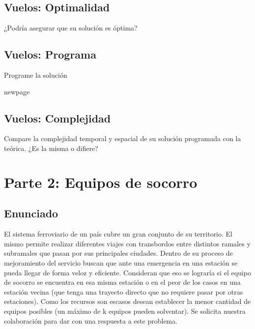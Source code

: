 \documentclass[titlepage,a4paper]{article}
\begin{document}
\filbreak\subsection{Vuelos: Optimalidad}\label{sec:parte1_3}
\begin{tcolorbox}[colback=blue!5!white,colframe=blue!75!black,title=Enunciado P1.3]
    ¿Podría asegurar que su solución es óptima?
\end{tcolorbox}



\newpage\subsection{Vuelos: Programa}\label{sec:parte1_4}
\begin{tcolorbox}[colback=blue!5!white,colframe=blue!75!black,title=Enunciado P1.4]
    Programe la solución
\end{tcolorbox}



newpage\subsection{Vuelos: Complejidad}\label{sec:parte1_5}
\begin{tcolorbox}[colback=blue!5!white,colframe=blue!75!black,title=Enunciado P1.5]
    Compare la complejidad temporal y espacial de su solución programada con la teórica.
    ¿Es la misma o difiere?
\end{tcolorbox}






\setcounter{section}{1}%
\renewcommand{\thesection}{P\arabic{section}}%

\newpage\section{Parte 2: Equipos de socorro}\label{sec:parte2}

\setcounter{subsection}{0}%
\renewcommand{\thesubsection}{\alph{subsection}}%

\subsection{Enunciado}
El sistema ferroviario de un país cubre un gran conjunto de su territorio. El mismo permite realizar diferentes viajes con transbordos entre distintos ramales y subramales que pasan por sus principales ciudades. Dentro de su proceso de mejoramiento del servicio buscan que ante una emergencia en una estación se pueda llegar de forma veloz y eficiente. Consideran que eso se lograría si el equipo de socorro se encuentra en esa misma estación o en el peor de los casos en una estación vecina (que tenga una trayecto directo que no requiere pasar por otras estaciones). Como los recursos son escasos desean establecer la menor cantidad de equipos posibles (un máximo de k equipos pueden solventar). Se solicita nuestra colaboración para dar con una respuesta a este problema.
\end{document}
